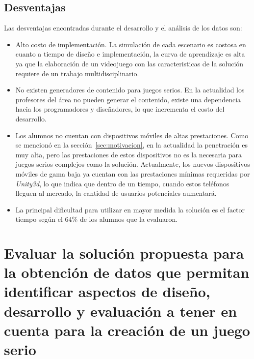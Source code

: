 \subsection{Desventajas}

Las desventajas encontradas durante el desarrollo y el análisis de los datos son:

\begin{itemize}

\item Alto costo de implementación. La simulación de cada escenario es costosa en cuanto a tiempo de diseño e implementación, la curva de aprendizaje es alta ya que la elaboración de un videojuego con las caracteristicas de la solución requiere de un trabajo multidisciplinario.

\item No existen generadores de contenido para juegos serios. En la actualidad los profesores del área no pueden generar el contenido, existe una dependencia hacia los programadores y diseñadores, lo que incrementa el costo del desarrollo.

\item Los alumnos no cuentan con dispositivos móviles de altas prestaciones. Como se mencionó en la sección~\ref{sec:motivacion}, en la actualidad la penetración es muy alta, pero las prestaciones de estos dispositivos no es la necesaria para juegos serios complejos como la solución. Actualmente, los nuevos dispositivos móviles de gama baja ya cuentan con las prestaciones mínimas requeridas por \textit{Unity3d}, lo que indica que dentro de un tiempo, cuando estos teléfonos lleguen al mercado, la cantidad de usuarios potenciales aumentará.


\item La principal dificultad para utilizar en mayor medida la solución es el factor tiempo según el $64\%$ de los alumnos que la evaluaron.

\end{itemize}

\section[Evaluación de solución propuesta]%
{Evaluar la solución propuesta para la obtención de datos que permitan identificar aspectos de diseño, desarrollo y evaluación a tener en cuenta para la creación de un juego serio}

